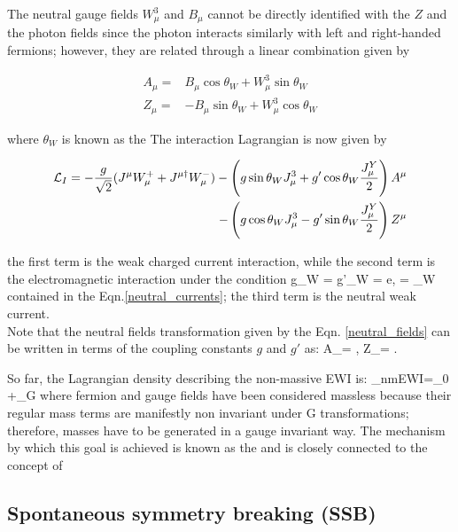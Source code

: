 The neutral gauge fields $W^3_\mu$ and $B_\mu$ cannot be directly identified with the $Z$ and the photon fields since the photon interacts similarly with left and right-handed fermions; however, they are related through a linear combination given by

\begin{align}\label{neutral_fields}
A_\mu = &  B_\mu \cos\theta_W + W^3_\mu \sin\theta_W \\ 
Z_\mu = & -B_\mu \sin\theta_W + W^3_\mu \cos\theta_W \nonumber 
\end{align}

\noindent where $\theta_W$ is known as the  The interaction Lagrangian is now given by

\begin{align}
\mathcal{L}_I =-\frac{g}{\sqrt{2}}(J^\mu W_\mu^+ + J^{\mu\dagger}W_\mu^-) -\left(g\sin\theta_W J_\mu^3 + g'\cos\theta_W \frac{J_\mu^Y}{2} \right)A^\mu \\ \nonumber
- \left(g\cos\theta_W J_\mu^3 - g'\sin\theta_W \frac{J_\mu^Y}{2} \right)Z^\mu 
\end{align}

\noindent the first term is the weak charged current interaction, while the second term is the electromagnetic interaction under the condition
\beqn
g\sin\theta_W = g'\cos\theta_W = e, \quad {}= \tan\theta_W  
\eeqn
\noindent contained in the Eqn.\ref{neutral_currents}; the third term is the neutral weak current.\\

Note that the neutral fields transformation given by the Eqn. \ref{neutral_fields} can be written in terms of the coupling constants $g$ and $g'$ as:
\beqn\label{neutral_bosons}
A_\mu= , \qquad  Z_\mu= .
\eeqn

So far, the Lagrangian density describing the non-massive EWI is:
\beqn\label{nmewi_lagr}
\Lagr_{nmEWI}=\Lagr_0 +\Lagr_G
\eeqn
\noindent where fermion and gauge fields have been considered massless because their regular mass terms are manifestly non invariant under G transformations; therefore, masses have to be generated in a gauge invariant way. The mechanism by which this goal is achieved is known as the  and is closely connected to the concept of 

\subsection{Spontaneous symmetry breaking (SSB)}

